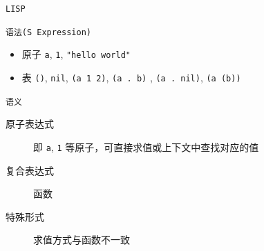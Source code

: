 \documentclass[presentation, bigger]{beamer}
\begin{document}
\begin{frame}[label={sec:org3aa0441},fragile]{\texttt{LISP}}
 \begin{block}{\texttt{语法(S Expression)}}
\begin{itemize}
\item 原子 \texttt{a}, \texttt{1}, \texttt{"hello world"}
\item 表 \texttt{()}, \texttt{nil}, \texttt{(a 1 2)}, \texttt{(a . b)} , \texttt{(a . nil)}, \texttt{(a (b))}
\end{itemize}
\end{block}
\begin{block}{\texttt{语义}}
\begin{description}
\item[{原子表达式}] 即 \texttt{a}, \texttt{1} 等原子，可直接求值或上下文中查找对应的值
\item[{复合表达式}] 函数
\item[{特殊形式}] 求值方式与函数不一致
\end{description}
\end{block}
\end{frame}
\end{document}
